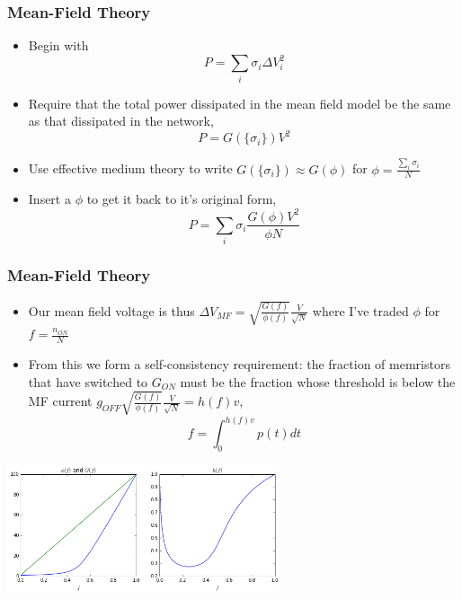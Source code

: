 \documentclass[mathserif]{beamer}
\begin{document}
\begin{frame}
\frametitle{Mean-Field Theory}
\begin{itemize}
\item Begin with $$P = \sum_i \sigma_i \Delta V_i^2$$
\item Require that the total power dissipated in the mean field model be the same
as that dissipated in the network,
$$P = G(\{\sigma_i\})V^2$$
\item Use effective medium theory to write $G(\{\sigma_i\})\approx G(\phi)$ for $\phi = \frac{\sum_i \sigma_i}{N}$
\item Insert a $\phi$ to get it back to it's original form,
$$P = \sum_i \sigma_i \frac{G(\phi)V^2}{\phi N}$$
\end{itemize}

\end{frame}

\begin{frame}
\frametitle{Mean-Field Theory}
\begin{itemize}
\item Our mean field voltage is thus
$\Delta V_{MF} = \sqrt{\frac{G(f)}{\phi(f)}}\frac{V}{\sqrt{N}}$
where I've traded $\phi$ for $f = \frac{n_{ON}}{N}$
\item From this we form a self-consistency requirement: the fraction of memristors
that have switched to $G_{ON}$ must be the fraction whose threshold is below the MF
current $g_{OFF} \sqrt{\frac{G(f)}{\phi(f)}}\frac{V}{\sqrt{N}} = h(f)v$,
$$f = \int_0^{h(f)v} p(t) dt$$
\end{itemize}
\begin{center}
\includegraphics[width=0.6\textwidth]{MF_voltage.png}
\end{center}
\end{frame}
\end{document}
